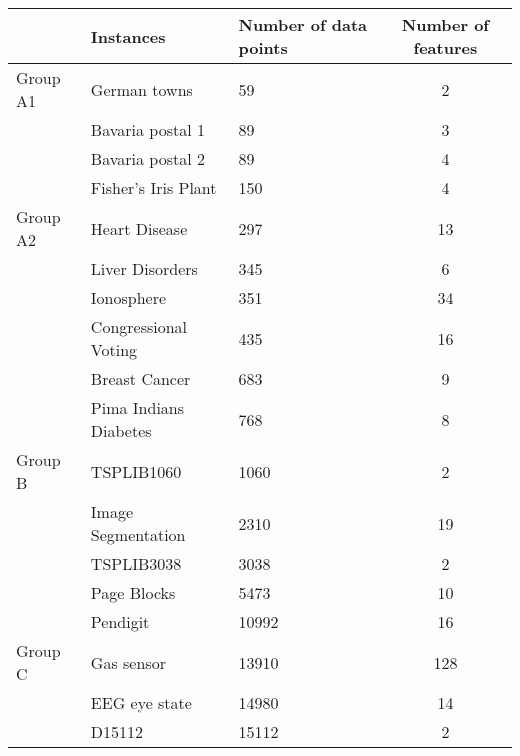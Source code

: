 \begin{table}[!h]
\centering
\begin{tabular}{@{}lllc@{}}
\toprule
         & Instances                       & Number of data points & Number of features \\ \midrule
Group A1 & German towns                    & 59                    & 2                  \\
         & Bavaria postal 1                & 89                    & 3                  \\
         & Bavaria postal 2                & 89                    & 4                  \\
         & Fisher’s Iris Plant             & 150                   & 4                  \\ \midrule
Group A2 & Heart Disease                   & 297                   & 13                 \\
         & Liver Disorders                 & 345                   & 6                  \\
         & Ionosphere                      & 351                   & 34                 \\
         & Congressional Voting            & 435                   & 16                 \\
         & Breast Cancer                   & 683                   & 9                  \\
         & Pima Indians Diabetes           & 768                   & 8                  \\ \midrule
Group B  & TSPLIB1060                      & 1060                  & 2                  \\
         & Image Segmentation              & 2310                  & 19                 \\
         & TSPLIB3038                      & 3038                  & 2                  \\
         & Page Blocks                     & 5473                  & 10                 \\
         & Pendigit                        & 10992                 & 16                 \\ \midrule
Group C  & Gas sensor                      & 13910                 & 128                \\
         & EEG eye state                   & 14980                 & 14                 \\
         & D15112                          & 15112                 & 2                  \\

\end{tabular}
\end{table}
